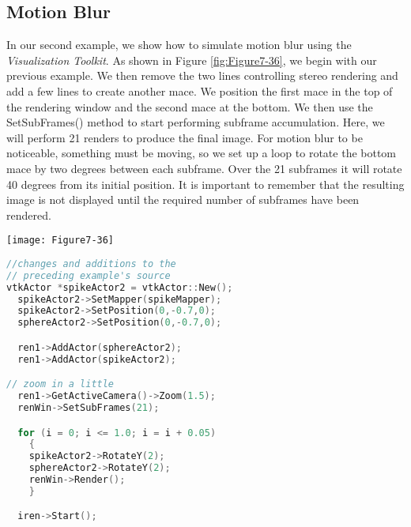 \subsection{Motion Blur}

\begin{minipage}[b]{0.5\linewidth}
	In our second example, we show how to simulate motion blur using the \emph{Visualization Toolkit}. As shown in Figure \ref{fig:Figure7-36}, we begin with our previous example. We then remove the two lines controlling stereo rendering and add a few lines to create another mace. We position the first mace in the top of the rendering window and the second mace at the bottom. We then use the SetSubFrames() method to start performing subframe accumulation. Here, we will perform 21 renders to produce the final image. For motion blur to be noticeable, something must be moving, so we set up a loop to rotate the bottom mace by two degrees between each subframe. Over the 21 subframes it will rotate 40 degrees from its initial position. It is important to remember that the resulting image is not displayed until the required number of subframes have been rendered.
\end{minipage}
\hfill
\begin{minipage}[b]{0.4\linewidth}
	\centering
	\texttt{[image: Figure7-36]}
	\label{fig:Figure7-36}
\end{minipage}

\begin{lstlisting}[language=C++, caption={An example of motion blur.}]
//changes and additions to the
// preceding example's source
vtkActor *spikeActor2 = vtkActor::New();
  spikeActor2->SetMapper(spikeMapper);
  spikeActor2->SetPosition(0,-0.7,0);
  sphereActor2->SetPosition(0,-0.7,0);

  ren1->AddActor(sphereActor2);
  ren1->AddActor(spikeActor2);

// zoom in a little
  ren1->GetActiveCamera()->Zoom(1.5);
  renWin->SetSubFrames(21);

  for (i = 0; i <= 1.0; i = i + 0.05)
    {
    spikeActor2->RotateY(2);
    sphereActor2->RotateY(2);
    renWin->Render();
    }

  iren->Start();
\end{lstlisting}

